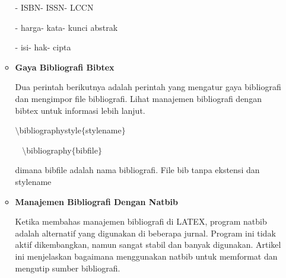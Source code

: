 \begin{itemize}
\begin{itemize}
\hspace*{0.5in}- ISBN\hspace*{0.5in}\hspace*{0.5in}- ISSN\hspace*{0.5in}\hspace*{0.5in}- LCCN\par

\hspace*{0.5in}- harga\hspace*{0.5in}\hspace*{0.5in}- kata\hspace*{0.5in}\hspace*{0.5in}- kunci abstrak\par

\hspace*{0.5in}- isi\hspace*{0.5in}\hspace*{0.5in}- hak\hspace*{0.5in}\hspace*{0.5in}- cipta\par

	\item {\fontsize{14pt}{14pt}\selectfont \textbf{Gaya Bibliografi Bibtex}}\par

Dua perintah berikutnya adalah perintah yang mengatur gaya bibliografi dan mengimpor file bibliografi. Lihat manajemen bibliografi dengan bibtex untuk informasi lebih lanjut. \par

$\setminus$bibliographystyle$ \{ $stylename$ \} $\par

~ \hspace*{0.5in}$\setminus$bibliography$ \{ $bibfile$ \} $\par

dimana bibfile adalah nama bibliografi. File bib tanpa ekstensi dan stylename\par

\vspace{12pt}
	\item {\fontsize{14pt}{14pt}\selectfont \textbf{Manajemen Bibliografi Dengan Natbib}}\par

Ketika membahas manajemen bibliografi di LATEX, program natbib adalah alternatif yang digunakan di beberapa jurnal. Program ini tidak aktif dikembangkan, namun sangat stabil dan banyak digunakan. Artikel ini menjelaskan bagaimana menggunakan natbib untuk memformat dan mengutip sumber bibliografi.\par


\end{itemize}
\end{itemize}
